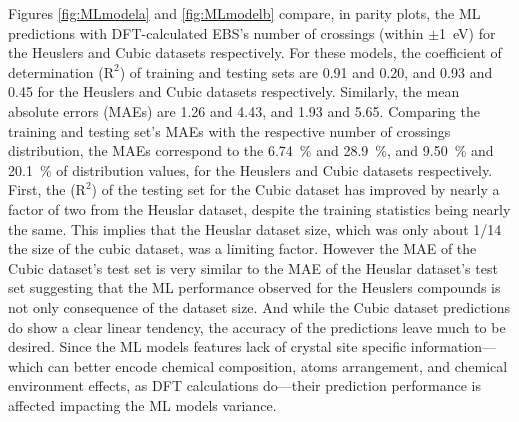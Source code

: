 \documentclass[article]{elsarticle}
\begin{document}
Figures \ref{fig:MLmodela} and \ref{fig:MLmodelb} compare, in parity plots, the ML predictions with DFT-calculated EBS's number of crossings (within $\pm$\SI{1}{\electronvolt}) for the Heuslers and Cubic datasets respectively. For these models, the coefficient of determination ($\mathrm{R^2}$) of training and testing sets are \num{0.91} and \num{0.20}, and \num{0.93} and \num{0.45} for the Heuslers and Cubic datasets respectively. Similarly, the mean absolute errors (MAEs) are \num{1.26} and \num{4.43}, and \num{1.93} and \num{5.65}. Comparing the training and testing set's MAEs with the respective number of crossings distribution, the MAEs correspond to the \SI{6.74}{\percent} and \SI{28.9}{\percent}, and \SI{9.50}{\percent} and \SI{20.1}{\percent} of distribution values, for the Heuslers and Cubic datasets respectively. First, the ($\mathrm{R^2}$) of the testing set for the Cubic dataset has improved by nearly a factor of two from the Heuslar dataset, despite the training statistics being nearly the same. This implies that the Heuslar dataset size, which was only about 1/14 the size of the cubic dataset, was a limiting factor. However the MAE of the Cubic dataset's test set is very similar to the MAE of the Heuslar dataset's test set suggesting that the ML performance observed for the Heuslers compounds is not only consequence of the dataset size. And while the Cubic dataset predictions do show a clear linear tendency, the accuracy of the predictions leave much to be desired. Since the ML models features lack of crystal site specific information---which can better encode chemical composition, atoms arrangement, and chemical environment effects, as DFT calculations do---their prediction performance is affected impacting the ML models variance. %
\end{document}
